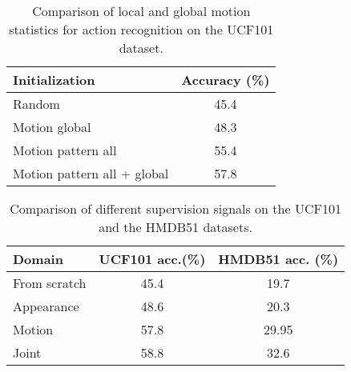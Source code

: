 \documentclass[10pt,twocolumn,letterpaper]{article}
\begin{document}
\begin{table}[t]
\caption{Comparison of local and global motion statistics for action recognition on the UCF101 dataset.}
\vspace{-6pt}
\begin{center}
\begin{tabular}{lc}
\hline
Initialization & Accuracy (\%) \\
\hline
Random & 45.4 \\
Motion global & 48.3 \\
Motion pattern all & 55.4\\
Motion pattern all + global & 57.8\\
\hline
\end{tabular}
\end{center}\vspace{-4mm}
\label{global}
\end{table}

\begin{table}\caption{Comparison of different supervision signals on the UCF101 and the HMDB51 datasets.}
\vspace{-6pt}
\begin{center}
\begin{tabular}{lcc}
\hline
Domain & UCF101 acc.(\%) & HMDB51 acc. (\%)\\
\hline
From scratch & 45.4 & 19.7\\
Appearance & 48.6 & 20.3\\
Motion & 57.8 & 29.95\\
Joint & 58.8 & 32.6 \\
\bottomrule
\end{tabular}
\end{center}\vspace{-6mm}
\label{table:joint}
\end{table}
\end{document}
